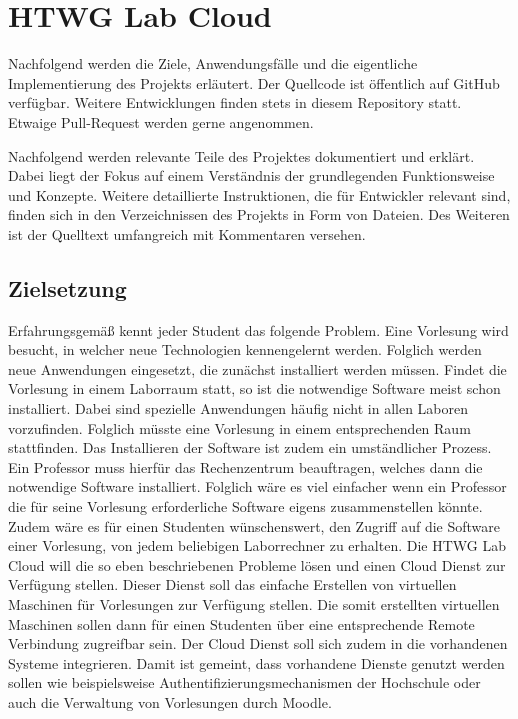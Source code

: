 \chapter{HTWG Lab Cloud}

Nachfolgend werden die Ziele, Anwendungsfälle und die eigentliche Implementierung des Projekts erläutert.
Der Quellcode ist öffentlich auf GitHub \cite{git-source} verfügbar. Weitere Entwicklungen finden stets in diesem Repository statt. Etwaige Pull-Request werden gerne angenommen.

Nachfolgend werden relevante Teile des Projektes dokumentiert und erklärt. Dabei liegt der Fokus auf einem Verständnis der grundlegenden Funktionsweise und Konzepte. Weitere detaillierte Instruktionen, die für Entwickler relevant sind, finden sich in den Verzeichnissen des Projekts in Form von  Dateien. Des Weiteren ist der Quelltext umfangreich mit Kommentaren versehen.

\section{Zielsetzung}
Erfahrungsgemäß kennt jeder Student das folgende Problem. Eine Vorlesung wird
besucht, in welcher neue Technologien kennengelernt werden. Folglich werden neue Anwendungen
eingesetzt, die zunächst installiert werden müssen. 
Findet die Vorlesung in einem Laborraum statt, 
so ist die notwendige Software meist schon installiert.
Dabei sind spezielle Anwendungen häufig nicht in allen Laboren vorzufinden. Folglich müsste
eine Vorlesung in einem entsprechenden Raum stattfinden.
Das Installieren der Software ist zudem ein umständlicher Prozess. Ein Professor muss hierfür
das Rechenzentrum beauftragen, welches dann die notwendige Software installiert.
Folglich wäre es viel einfacher wenn ein Professor die für seine Vorlesung erforderliche Software
eigens zusammenstellen könnte.
Zudem wäre es für einen Studenten wünschenswert, den Zugriff auf die Software einer Vorlesung,
von jedem beliebigen Laborrechner zu erhalten.
Die HTWG Lab Cloud will die so eben beschriebenen Probleme lösen und einen Cloud Dienst zur
Verfügung stellen. Dieser Dienst soll das einfache Erstellen von virtuellen Maschinen für
Vorlesungen zur Verfügung stellen. Die somit erstellten virtuellen Maschinen sollen dann für
einen Studenten über eine entsprechende Remote Verbindung zugreifbar sein. Der Cloud Dienst soll
sich zudem in die vorhandenen Systeme integrieren. Damit ist gemeint, dass vorhandene
Dienste genutzt werden sollen wie beispielsweise Authentifizierungsmechanismen der Hochschule
oder auch die Verwaltung von Vorlesungen durch Moodle.

